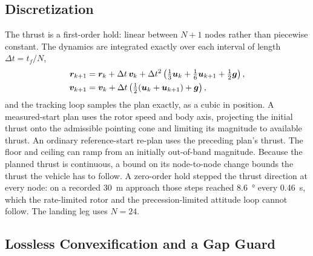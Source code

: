 \documentclass[10pt,letterpaper]{article}
\begin{document}
\subsection{Discretization}
\label{sec:discretization}

The thrust is a first-order hold: linear between $N + 1$ nodes rather than piecewise constant.
The dynamics are integrated exactly over each interval of length $\Delta t = t_f/N$,
\begin{equation}
\begin{split}
\bm{r}_{k+1} &= \bm{r}_k + \Delta t\,\bm{v}_k + \Delta t^2\left(\tfrac13\bm{u}_k + \tfrac16\bm{u}_{k+1} + \tfrac12\bm{g}\right),\\
\bm{v}_{k+1} &= \bm{v}_k + \Delta t\left(\tfrac12(\bm{u}_k + \bm{u}_{k+1}) + \bm{g}\right),
\end{split}
\label{eq:foh}
\end{equation}
and the tracking loop samples the plan exactly, as a cubic in position.
A measured-start plan uses the rotor speed and body axis, projecting the initial thrust onto the admissible pointing cone and limiting its magnitude to available thrust. An ordinary reference-start re-plan uses the preceding plan's thrust. The floor and ceiling can ramp from an initially out-of-band magnitude.
Because the planned thrust is continuous, a bound on its node-to-node change bounds the thrust the vehicle has to follow.
A zero-order hold stepped the thrust direction at every node: on a recorded \SI{30}{\metre} approach those steps reached \SI{8.6}{\degree} every \SI{0.46}{\second}, which the rate-limited rotor and the precession-limited attitude loop cannot follow.
The landing leg uses $N = 24$.

\subsection{Lossless Convexification and a Gap Guard}
\label{sec:lcvx}
\end{document}

